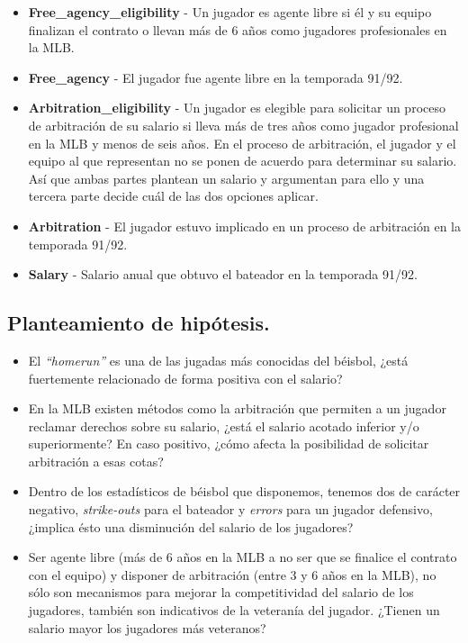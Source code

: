 \documentclass[a4paper,12pt, oneside]{book}
\begin{document}
\begin{itemize}
	\item \textbf{Free\_agency\_eligibility} - Un jugador es agente libre si él y su equipo finalizan el contrato o llevan más de 6 años como jugadores profesionales en la MLB.
	\item \textbf{Free\_agency} - El jugador fue agente libre en la temporada 91/92.
	\item \textbf{Arbitration\_eligibility} - Un jugador es elegible para solicitar un proceso de arbitración de su salario si lleva más de tres años como jugador profesional en la MLB y menos de seis años. En el proceso de arbitración, el jugador y el equipo al que representan no se ponen de acuerdo para determinar su salario. Así que ambas partes plantean un salario y argumentan para ello y una tercera parte decide cuál de las dos opciones aplicar.
	\item \textbf{Arbitration} - El jugador estuvo implicado en un proceso de arbitración en la temporada 91/92.
	\item \textbf{Salary} - Salario anual que obtuvo el bateador en la temporada 91/92.
\end{itemize}

\subsection{Planteamiento de hipótesis.}
\begin{itemize}
\item El \textit{``homerun''} es una de las jugadas más conocidas del béisbol, ¿está fuertemente relacionado de forma positiva con el salario?
\item En la MLB existen métodos como la arbitración que permiten a un jugador reclamar derechos sobre su salario, ¿está el salario acotado inferior y/o superiormente? En caso positivo, ¿cómo afecta la posibilidad de solicitar arbitración a esas cotas?
\item Dentro de los estadísticos de béisbol que disponemos, tenemos dos de carácter negativo, \textit{strike-outs} para el bateador y \textit{errors} para un jugador defensivo, ¿implica ésto una disminución del salario de los jugadores?
\item Ser agente libre (más de 6 años en la MLB a no ser que se finalice el contrato con el equipo) y disponer de arbitración (entre 3 y 6 años en la MLB), no sólo son mecanismos para mejorar la competitividad del salario de los jugadores, también son indicativos de la veteranía del jugador. ¿Tienen un salario mayor los jugadores más veteranos?
\end{itemize}
\end{document}
